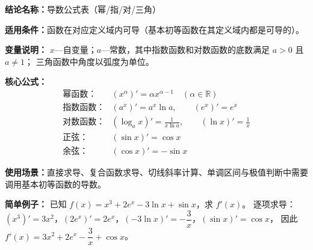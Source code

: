 \textbf{结论名称：}导数公式表（幂/指/对/三角）

\textbf{适用条件：}函数在对应定义域内可导（基本初等函数在其定义域内都是可导的）。

\textbf{变量说明：}
$x$---自变量；$a$---常数，其中指数函数和对数函数的底数满足 $a>0$ 且 $a\neq 1$；
三角函数中角度以弧度为单位。

\textbf{核心公式：}
\[
\boxed{
\begin{array}{ll}
\text{幂函数：}& \displaystyle (x^\alpha)' = \alpha x^{\alpha-1}\quad(\alpha\in\mathbb{R}) \\[6pt]
\text{指数函数：}& \displaystyle (a^x)' = a^x\ln a,\qquad (e^x)' = e^x \\[6pt]
\text{对数函数：}& \displaystyle (\log_a x)' = \frac{1}{x\ln a},\qquad (\ln x)' = \frac{1}{x} \\[6pt]
\text{正弦：}& (\sin x)' = \cos x \\[6pt]
\text{余弦：}& (\cos x)' = -\sin x
\end{array}
}
\]

\textbf{使用场景：}直接求导、复合函数求导、切线斜率计算、单调区间与极值判断中需要调用基本初等函数的导数。

\textbf{简单例子：}
已知 $f(x)=x^3+2e^x-3\ln x+\sin x$，求 $f'(x)$。
逐项求导：$(x^3)'=3x^2$，$(2e^x)'=2e^x$，$(-3\ln x)'=-\dfrac{3}{x}$，$(\sin x)'=\cos x$，
因此 $f'(x)=3x^2+2e^x-\dfrac{3}{x}+\cos x$。